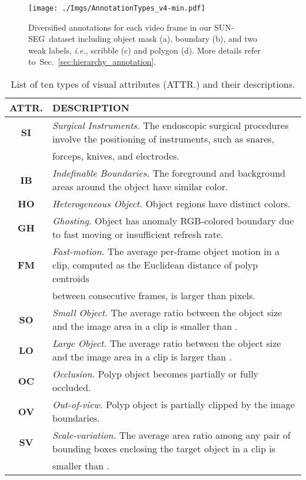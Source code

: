 \documentclass[default,iicol]{sn-jnl}
\theoremstyle{thmstyleone}
\theoremstyle{thmstyletwo}
\theoremstyle{thmstylethree}
\newcommand{\secref}[1]{Sec.~\ref{#1}}
\def\ie{\emph{i.e.}}
\def\ourdataset{SUN-SEG}
\begin{document}
\begin{figure}[t!]
    \centering
    \texttt{[image: ./Imgs/AnnotationTypes\_v4-min.pdf]}
    \caption{Diversified annotations for each video frame in our \ourdataset~dataset including object mask (a), boundary (b), and two weak labels, \ie, scribble (c) and polygon (d).
More details refer to~\secref{sec:hierarchy_annotation}.
    }\label{fig:annotation_types}
\end{figure}

\begin{table*}[t!]
    \footnotesize
    \renewcommand{\arraystretch}{1.0}
    \setlength\tabcolsep{4pt}
    \caption{List of ten types of visual attributes (ATTR.) and their descriptions.}\label{tab:Attr}
    \begin{tabular*}{\linewidth}{cl}
    \hline
    \textbf{ATTR.} & \textbf{DESCRIPTION} \\
\hline
    \textbf{SI}
    & \emph{Surgical Instruments.} The endoscopic surgical procedures involve the positioning of instruments, such as snares, \\
    & forceps, knives, and electrodes. \\
\textbf{IB}
    & \emph{Indefinable Boundaries.} The foreground and background areas around the object have similar color. \\
\textbf{HO}
    & \emph{Heterogeneous Object.} Object regions have distinct colors. \\
\textbf{GH}
    & \emph{Ghosting.} Object has anomaly RGB-colored boundary due to fast moving or insufficient refresh rate. \\
\textbf{FM}
    & \emph{Fast-motion.} The average per-frame object motion in a clip, computed as the Euclidean distance of polyp centroids \\
    & between consecutive frames, is larger than  pixels. \\
\textbf{SO}
    & \emph{Small Object.} The average ratio between the object size and the image area in a clip is smaller than . \\
\textbf{LO}
    & \emph{Large Object.} The average ratio between the  object size and the image area in a clip is larger than . \\
\textbf{OC}
    & \emph{Occlusion.} Polyp object becomes partially or fully occluded. \\
\textbf{OV}
    & \emph{Out-of-view.} Polyp object is partially clipped by the image boundaries. \\
\textbf{SV}
    & \emph{Scale-variation.} The average area ratio among any pair of bounding boxes enclosing the target object in a clip is \\
    & smaller than . \\
\hline
    \end{tabular*}
\end{table*}
\end{document}
